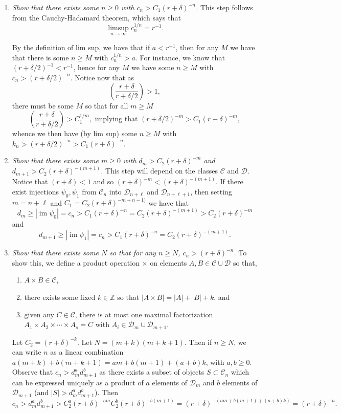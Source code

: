 \documentclass[amsmath,longbibliography,secnumarabic,floatfix,amssymb,nofootinbib,nobibnotes,letterpaper,11pt,notitlepage,preprint]{revtex4-1}
\newcommand{\Z}{\mathbb{Z}} \newcommand{\N}{\mathbb{N}}
\newcommand{\ArbClass}{\mathscr{C}}
\newcommand{\ArbSubClass}{\mathscr{D}}
\newcommand{\arbsubclass}{d}
\newcommand{\arbclass}{c}
\DeclareMathOperator{\im}{im}
\begin{document}
\begin{enumerate}
\item \emph{Show that there exists some $n \ge 0$ with $\arbclass_n > C_1(r + \delta)^{-n}$.} This
  step follows from the Cauchy-Hadamard theorem, which says that
  \[ \limsup_{n\to\infty}{\arbclass_n^{1/n}} = r^{-1}. \]

  By the definition of lim sup, we have that if $a < r^{-1}$, then for any $M$ we have that there is
  some $n \ge M$ with $\arbclass_n^{1/n} > a$. For instance, we know that $(r + \delta/2)^{-1} < r^{-1}$,
  hence for any $M$ we have some $n \ge M$ with $\arbclass_n > (r+\delta/2)^{-n}$. Notice now that as
  \[ \left( \frac{r+\delta}{r + \delta/2} \right) > 1, \] there must be some $M$ so that for all $m
  \ge M$
  \[ \left( \frac{r+\delta}{r + \delta/2} \right) > C_1^{1/m}, \text{ implying that } (r +
  \delta/2)^{-m} > C_1(r + \delta)^{-m}, \] whence we then have (by lim sup) some $n \ge M$ with
  $k_n > (r+\delta/2)^{-n} > C_1(r+\delta)^{-n}$.
\item \emph{Show that there exists some $m \ge 0$ with $\arbsubclass_m > C_2(r + \delta)^{-m}$ and
    $\arbsubclass_{m+1} > C_2(r + \delta)^{-(m+1)}$.} This step will depend on the classes
  $\ArbClass$ and $\ArbSubClass$. Notice that $(r + \delta) < 1$ and so $(r + \delta)^{-m} <
  (r+\delta)^{-(m+1 )}$. If there exist injections $\psi_0, \psi_1$ from $\ArbClass_n$ into
  $\ArbSubClass_{n+\ell}$ and $\ArbSubClass_{n+\ell+1}$, then setting $m = n + \ell$ and $C_1 =
  C_2(r+\delta)^{-m+n-1)}$ we have that
  \[ \arbsubclass_m \ge |\im \psi_0| = \arbclass_n > C_1(r+\delta)^{-n} = C_2(r+\delta)^{-(m+1)} >
  C_2(r+\delta)^{-m} \]
  and
  \[ \arbsubclass_{m+1} \ge |\im \psi_1| = \arbclass_n > C_1(r+\delta)^{-n} =
  C_2(r+\delta)^{-(m+1)}. \]
\item \emph{Show that there exists some $N$ so that for any $n \ge N$, $\arbclass_n > (r +
    \delta)^{-n}$.} To show this, we define a product operation $\times$ on elements $A, B \in
  \ArbClass \cup \ArbSubClass$ so that,
  \begin{enumerate}
  \item $A \times B \in \ArbClass$,
  \item there exists some fixed $k \in \Z$ so that $|A \times B| = |A| + |B| + k$, and
  \item given any $C \in \ArbClass$, there is at most one maximal factorization $A_1 \times A_2 \times
    \cdots \times A_s = C$ with $A_i \in \ArbSubClass_m \cup \ArbSubClass_{m+1}$.
  \end{enumerate}
  Let $C_2 = (r + \delta)^{-k}$. Let $N = (m + k)(m + k + 1)$. Then if $n \ge N$, we can write $n$
  as a linear combination $a(m + k) + b(m + k + 1) = am + b(m + 1) + (a+b)k$, with $a, b \ge
  0$. Observe that $c_n > \arbsubclass_m^a\arbsubclass_{m+1}^b$ as there exists a subset of objects
  $S \subset \ArbClass_n$ which can be expressed uniquely as a product of $a$ elements of
  $\ArbSubClass_m$ and $b$ elements of $\ArbSubClass_{m+1}$ (and $|S| >
  \arbsubclass_m^a\arbsubclass_{m+1}^b$). Then
  \[ c_n > d_m^ad_{m+1}^b > C_2^a(r+\delta)^{-am}C_2^b(r+\delta)^{-b(m+1)} = (r+\delta)^{-(am +b(m+1)+(a+b)k)} = (r+\delta)^{-n}.\]
\end{enumerate}
\end{document}
